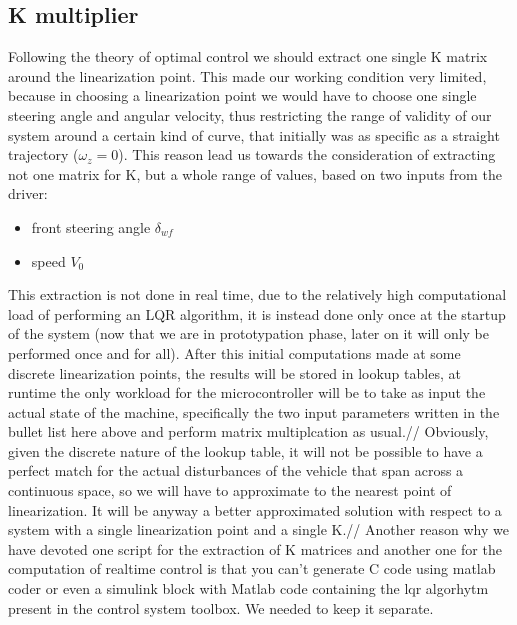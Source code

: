 \subsection{K multiplier}
Following the theory of optimal control we should extract one single K matrix around the linearization point. This made our working condition very limited, because in choosing a linearization point we would have to choose one single steering angle and angular velocity, thus restricting the range of validity of our system around a certain kind of curve, that initially was as specific as a straight trajectory ($\omega_{z}=0$).
This reason lead us towards the consideration of extracting not one matrix for K, but a whole range of values, based on two inputs from the driver:
\begin{itemize}
	\item front steering angle $\delta_{wf}$
	\item speed $V_0$
\end{itemize}	
This extraction is not done in real time, due to the relatively high computational load of performing an LQR algorithm, it is instead done only once at the startup of the system (now that we are in prototypation phase, later on it will only be performed once and for all). After this initial computations made at some discrete linearization points, the results will be stored in lookup tables, at runtime the only workload for the microcontroller will be to take as input the actual state of the machine, specifically the two input parameters written in the bullet list here above and perform matrix multiplcation as usual.//
Obviously, given the discrete nature of the lookup table, it will not be possible to have a perfect match for the actual disturbances of the vehicle that span across a continuous space, so we will have to approximate to the nearest point of linearization. It will be anyway a better approximated solution with respect to a system with a single linearization point and a single K.//
Another reason why we have devoted one script for the extraction of K matrices and another one for the computation of realtime control is that you can't generate C code using matlab coder or even a simulink block with Matlab code containing the lqr algorhytm present in the control system toolbox. We needed to keep it separate.